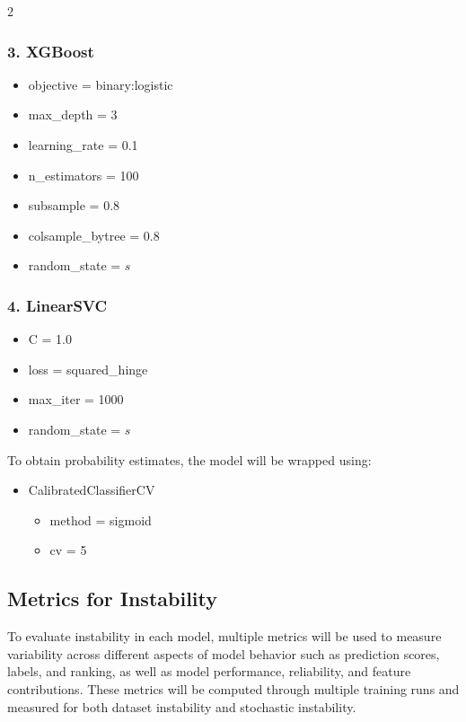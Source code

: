\documentclass[12pt]{article}
\begin{document}
\begin{multicols}{2}
\subsubsection*{3. XGBoost}
  \begin{itemize}
    \item objective = binary:logistic
    \item max\_depth = 3
    \item learning\_rate = 0.1
    \item n\_estimators = 100
    \item subsample = 0.8
    \item colsample\_bytree = 0.8
    \item random\_state = $s$
  \end{itemize} 

  \columnbreak
  
  \subsubsection*{4. LinearSVC}
  \begin{itemize}
    \item C = 1.0
    \item loss = squared\_hinge
    \item max\_iter = 1000
    \item random\_state = $s$
  \end{itemize}
  
  To obtain probability estimates, the model will be wrapped using:
  \begin{itemize}
    \item CalibratedClassifierCV
    \begin{itemize}
      \item method = sigmoid
      \item cv = 5
    \end{itemize}
  \end{itemize}
\end{multicols}
  
\subsection{Metrics for Instability}
To evaluate instability in each model, multiple metrics will be used to measure variability across different aspects of model behavior such as prediction scores, labels, and ranking, as well as model performance, reliability, and feature contributions. These metrics will be computed through multiple training runs and measured for both dataset instability and stochastic instability.\\
\end{document}

